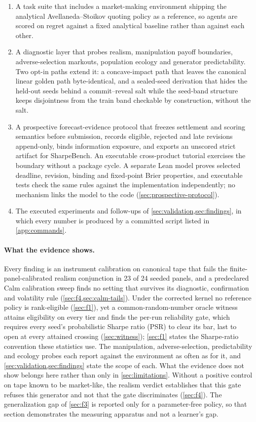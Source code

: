 \begin{enumerate}[leftmargin=*,itemsep=2pt]
\item A task suite that includes a market-making environment shipping the analytical Avellaneda--Stoikov quoting policy \citep{avellaneda2008high,gueant2013dealing} as a reference, so agents are scored on regret against a fixed analytical baseline rather than against each other.
\item A diagnostic layer that probes realism, manipulation payoff boundaries, adverse-selection markouts, population ecology and generator predictability. Two opt-in paths extend it: a concave-impact path that leaves the canonical linear golden path byte-identical, and a sealed-seed derivation that hides the held-out seeds behind a commit--reveal salt while the seed-band structure keeps disjointness from the train band checkable by construction, without the salt.
\item A prospective forecast-evidence protocol that freezes settlement and scoring semantics before submission, records eligible, rejected and late revisions append-only, binds information exposure, and exports an unscored strict artifact for SharpeBench. An executable cross-product tutorial exercises the boundary without a package cycle. A separate Lean model proves selected deadline, revision, binding and fixed-point Brier properties, and executable tests check the same rules against the implementation independently; no mechanism links the model to the code (\cref{sec:prospective-protocol}).
\item The executed experiments and follow-ups of \cref{sec:validation,sec:findings}, in which every number is produced by a committed script listed in \cref{app:commands}.
\end{enumerate}

\paragraph{What the evidence shows.} Every finding is an instrument calibration on canonical tape that fails the finite-panel-calibrated realism conjunction in 23 of 24 seeded panels, and a predeclared Calm calibration sweep finds no setting that survives its diagnostic, confirmation and volatility rule (\cref{sec:f4,sec:calm-tails}). Under the corrected kernel no reference policy is rank-eligible (\cref{sec:f1}), yet a common-random-number oracle witness attains eligibility on every tier and finds the per-run reliability gate, which requires every seed's probabilistic Sharpe ratio (PSR) \citep{bailey2012sharpe} to clear its bar, last to open at every attained crossing (\cref{sec:witness}); \cref{sec:f1} states the Sharpe-ratio convention these statistics use. The manipulation, adverse-selection, predictability and ecology probes each report against the environment as often as for it, and \cref{sec:validation,sec:findings} state the scope of each. What the evidence does not show belongs here rather than only in \cref{sec:limitations}. Without a positive control on tape known to be market-like, the realism verdict establishes that this gate refuses this generator and not that the gate discriminates (\cref{sec:f4}). The generalization gap of \cref{sec:f3} is reported only for a parameter-free policy, so that section demonstrates the measuring apparatus and not a learner's gap.
